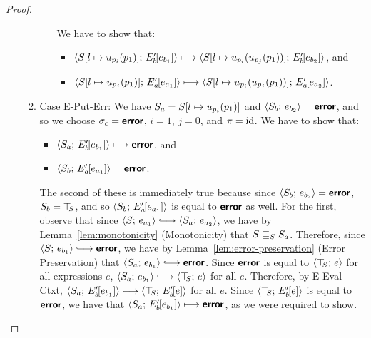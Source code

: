 \begin{proof}
\begin{enumerate}
\begin{enumerate}
\begin{itemize}
          We have to show that:
          \begin{itemize}
          \item
            $\langle S[l \mapsto u_{p_i}(p_1)];\, E'_b\hspace{-1mm}\left[e_{b_1}\right] \rangle
            \longmapsto
            \langle S[l \mapsto u_{p_i}(u_{p_j}(p_1))];\, E'_b\hspace{-1mm}\left[e_{b_2}\right] \rangle$,
            and
          \item
            $\langle S[l \mapsto u_{p_j}(p_1)];\, E'_a\hspace{-1mm}\left[e_{a_1}\right] \rangle
            \longmapsto
            \langle S[l \mapsto u_{p_i}(u_{p_j}(p_1))];\, E'_a\hspace{-1mm}\left[e_{a_2}\right] \rangle$.
          \end{itemize}
          \TODO{}

      \end{itemize}

    \item \label{slqc-put-put-err}Case {\sc E-Put-Err}: We have $S_a =
      S[l \mapsto u_{p_i}(p_1)]$ and $\langle S_b;\, e_{b_2} \rangle =
      \textbf{\textsf{error}}$, and so we choose $\sigma_c = \textbf{\textsf{error}}$, $i = 1$, $j = 0$,
      and $\pi = \mathrm{id}$.  We have to show that:
      \begin{itemize}
      \item $\langle S_a;\, E'_b\hspace{-1mm}\left[e_{b_1}\right] \rangle \longmapsto
        \textbf{\textsf{error}}$, and
      \item
        $\langle S_b;\, E'_a\hspace{-1mm}\left[e_{a_1}\right] \rangle = \textbf{\textsf{error}}$.
      \end{itemize}

      The second of these is immediately true because since
      $\langle S_b;\, e_{b_2} \rangle = \textbf{\textsf{error}}$, $S_b = \top\hspace{-0.85mm}_{S}$, and so
      $\langle S_b;\, E'_a\hspace{-1mm}\left[e_{a_1}\right] \rangle$ is equal to $\textbf{\textsf{error}}$ as
      well.  For the first, observe that since $\config{S}{e_{a_1}}
      \parstepsto \config{S_a}{e_{a_2}}$, we have by
      Lemma~\ref{lem:monotonicity} (Monotonicity) that
      $S \sqsubseteq_S S_a$.  Therefore, since $\config{S}{e_{b_1}}
      \parstepsto \error$, we have by
      Lemma~\ref{lem:error-preservation} (Error Preservation) that
      $\config{S_a}{e_{b_1}} \parstepsto \error$.  Since $\textbf{\textsf{error}}$ is
      equal to $\langle \top\hspace{-0.85mm}_{S};\, e \rangle$ for all expressions $e$,
      $\config{S_a}{e_{b_1}} \parstepsto \config{\topS}{e}$ for all
      $e$.  Therefore, by {\sc E-Eval-Ctxt},
      $\langle S_a;\, E'_b\hspace{-1mm}\left[e_{b_1}\right] \rangle \longmapsto
      \langle \top\hspace{-0.85mm}_{S};\, E'_b\hspace{-1mm}\left[e\right] \rangle$ for all $e$.  Since
      $\langle \top\hspace{-0.85mm}_{S};\, E'_b\hspace{-1mm}\left[e\right] \rangle$ is equal to $\textbf{\textsf{error}}$, we
      have that $\langle S_a;\, E'_b\hspace{-1mm}\left[e_{b_1}\right] \rangle \longmapsto
      \textbf{\textsf{error}}$, as we were required to show.


\end{enumerate}
\end{enumerate}
\end{proof}
